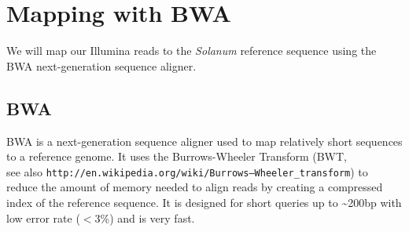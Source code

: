 \documentclass[12pt,a4paper]{article}
\begin{document}


\section{Mapping with BWA}

We will map our Illumina reads to the \emph{Solanum} reference
sequence using the BWA next-generation sequence aligner.

\subsection{BWA}

BWA is a next-generation sequence aligner used to map relatively short
sequences to a reference genome. It uses the Burrows-Wheeler Transform
(BWT, \\
see also \texttt{http://en.wikipedia.org/wiki/Burrows–Wheeler\_transform}) to
reduce the amount of memory needed to align reads by creating a
compressed index of the reference sequence. It is designed for short
queries up to \textasciitilde200bp with low error rate ($<$3\%) and is
very fast.
\end{document}
